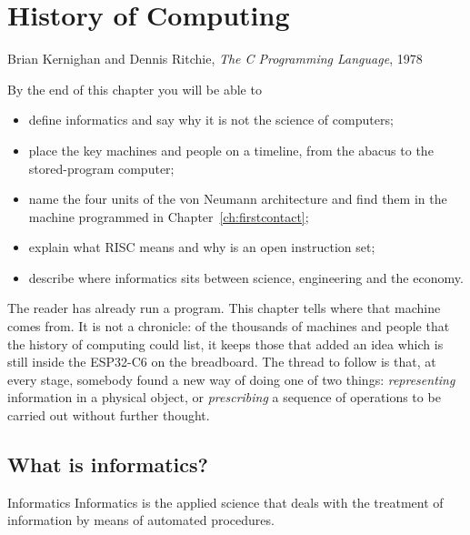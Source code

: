 \chapter{History of Computing}
\label{ch:history}

  {Brian Kernighan and Dennis Ritchie, \emph{The C Programming Language}, 1978}

\begin{chapgoals}
By the end of this chapter you will be able to
\begin{itemize}
\item define informatics and say why it is not the science of computers;
\item place the key machines and people on a timeline, from the abacus to the
  stored-program computer;
\item name the four units of the von Neumann architecture and find them in the
  machine programmed in Chapter~\ref{ch:firstcontact};
\item explain what RISC means and why \riscv is an open instruction set;
\item describe where informatics sits between science, engineering and the economy.
\end{itemize}
\end{chapgoals}


The reader has already run a \riscv program. This chapter tells where that
machine comes from. It is not a chronicle: of the thousands of machines and
people that the history of computing could list, it keeps those that added an
idea which is still inside the ESP32-C6 on the breadboard. The thread to
follow is that, at every stage, somebody found a new way of doing one of two
things: \emph{representing} information in a physical object, or
\emph{prescribing} a sequence of operations to be carried out without further
thought.

\section{What is informatics?}

\begin{definition}{Informatics}
Informatics is the applied science that deals with the treatment of
information by means of automated procedures.
\end{definition}

